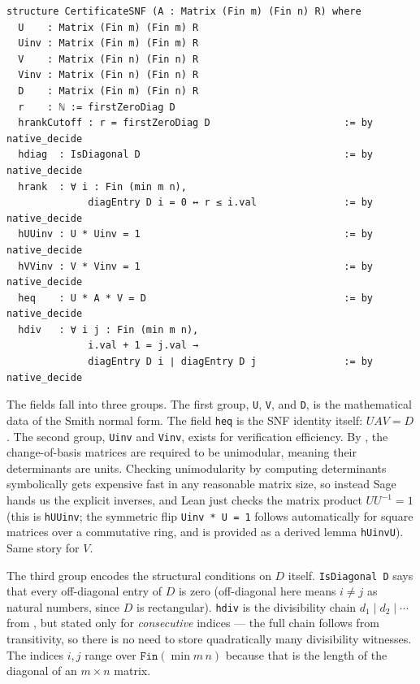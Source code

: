 \documentclass[11pt]{article}
\theoremstyle{plain}
\theoremstyle{definition}
\theoremstyle{remark}
\newcommand{\lean}[1]{\lstinline[language=lean]|#1|}
\begin{document}
\begin{lstlisting}[caption={The core SNF certificate.},label={lst:snf-certificate}]
structure CertificateSNF (A : Matrix (Fin m) (Fin n) R) where
  U    : Matrix (Fin m) (Fin m) R
  Uinv : Matrix (Fin m) (Fin m) R
  V    : Matrix (Fin n) (Fin n) R
  Vinv : Matrix (Fin n) (Fin n) R
  D    : Matrix (Fin m) (Fin n) R
  r    : ℕ := firstZeroDiag D
  hrankCutoff : r = firstZeroDiag D                       := by native_decide
  hdiag  : IsDiagonal D                                   := by native_decide
  hrank  : ∀ i : Fin (min m n),
              diagEntry D i = 0 ↔ r ≤ i.val               := by native_decide
  hUUinv : U * Uinv = 1                                   := by native_decide
  hVVinv : V * Vinv = 1                                   := by native_decide
  heq    : U * A * V = D                                  := by native_decide
  hdiv   : ∀ i j : Fin (min m n),
              i.val + 1 = j.val →
              diagEntry D i ∣ diagEntry D j               := by native_decide
\end{lstlisting}

The fields fall into three groups. The first group, \lean{U}, \lean{V}, and
\lean{D}, is the mathematical data of the Smith normal form. The field
\lean{heq} is the SNF identity itself: \(UAV = D\). The second group,
\lean{Uinv} and \lean{Vinv}, exists for verification efficiency. By
, the change-of-basis matrices are required to be unimodular,
meaning their determinants are units. Checking unimodularity by computing
determinants symbolically gets expensive fast in any reasonable matrix size,
so instead Sage hands us the explicit inverses, and Lean just checks the
matrix product \(U U^{-1} = 1\) (this is \lean{hUUinv}; the symmetric flip
\lean{Uinv * U = 1} follows automatically for square matrices over a
commutative ring, and is provided as a derived lemma \lean{hUinvU}). Same story
for \(V\).

The third group encodes the structural conditions on \(D\) itself.
\lean{IsDiagonal D} says that every off-diagonal entry of \(D\) is zero
(off-diagonal here means \(i \neq j\) as natural numbers, since \(D\) is
rectangular). \lean{hdiv} is the divisibility chain
\(d_1 \mid d_2 \mid \cdots\) from , but stated only for
\emph{consecutive} indices --- the full chain follows from transitivity, so
there is no need to store quadratically many divisibility witnesses. The
indices \(i, j\) range over \(\mathtt{Fin}(\min m\, n)\) because that is the
length of the diagonal of an \(m \times n\) matrix.
\end{document}
